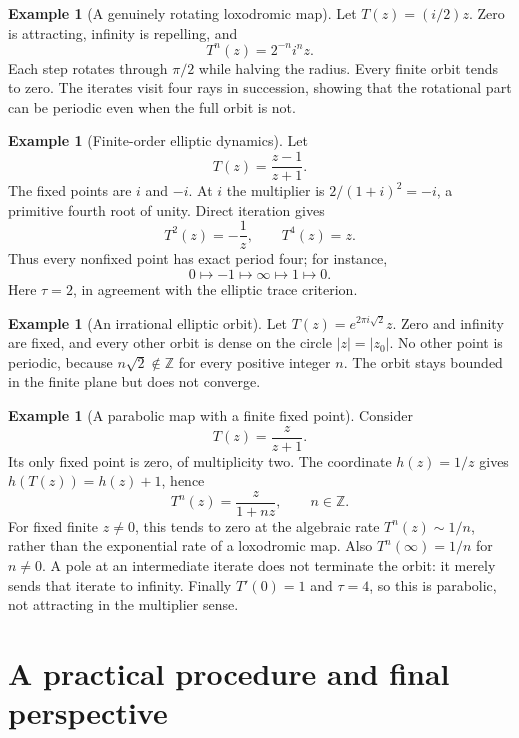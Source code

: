 \documentclass[11pt,a4paper]{article}
\newcommand{\Z}{\mathbb{Z}}
\newcommand{\abs}[1]{\left|#1\right|}
\theoremstyle{plain}
\theoremstyle{definition}
\newtheorem{example}[theorem]{Example}
\theoremstyle{remark}
\begin{document}
\begin{example}[A genuinely rotating loxodromic map]
Let $T(z)=(i/2)z$. Zero is attracting, infinity is repelling, and
\[
  T^n(z)=2^{-n}i^n z.
\]
Each step rotates through $\pi/2$ while halving the radius. Every finite
orbit tends to zero. The iterates visit four rays in succession, showing
that the rotational part can be periodic even when the full orbit is not.
\end{example}

\begin{example}[Finite-order elliptic dynamics]
Let
\[
  T(z)=\frac{z-1}{z+1}.
\]
The fixed points are $i$ and $-i$. At $i$ the multiplier is
$2/(1+i)^2=-i$, a primitive fourth root of unity. Direct iteration gives
\[
  T^2(z)=-\frac1z,\qquad T^4(z)=z.
\]
Thus every nonfixed point has exact period four; for instance,
\[
  0\longmapsto-1\longmapsto\infty\longmapsto1\longmapsto0.
\]
Here $\tau=2$, in agreement with the elliptic trace criterion.
\end{example}

\begin{example}[An irrational elliptic orbit]
Let $T(z)=e^{2\pi i\sqrt{2}}z$. Zero and infinity are fixed, and every
other orbit is dense on the circle $\abs{z}=\abs{z_0}$. No other point
is periodic, because $n\sqrt{2}\notin\Z$ for every positive integer $n$.
The orbit stays bounded in the finite plane but does not converge.
\end{example}

\begin{example}[A parabolic map with a finite fixed point]
Consider
\[
  T(z)=\frac{z}{z+1}.
\]
Its only fixed point is zero, of multiplicity two. The coordinate
$h(z)=1/z$ gives $h(T(z))=h(z)+1$, hence
\begin{equation}\label{eq:parabolic-example}
  T^n(z)=\frac{z}{1+nz},\qquad n\in\Z.
\end{equation}
For fixed finite $z\ne0$, this tends to zero at the algebraic rate
$T^n(z)\sim1/n$, rather than the exponential rate of a loxodromic map.
Also $T^n(\infty)=1/n$ for $n\ne0$. A pole at an intermediate iterate
does not terminate the orbit: it merely sends that iterate to infinity.
Finally $T'(0)=1$ and $\tau=4$, so this is parabolic, not attracting in
the multiplier sense.
\end{example}

\section{A practical procedure and final perspective}
\end{document}
